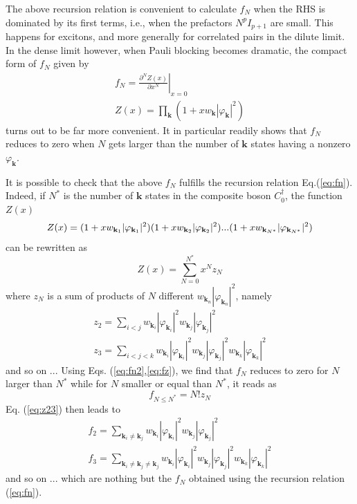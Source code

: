 \documentclass[aps,prb,preprint,groupedaddress,amsmath]{revtex4-1}
\newcommand{\vk}{\ensuremath{\mathbf{k}}}
\newcommand{\dg}{\ensuremath{\dagger}}
\begin{document}
The above recursion relation is convenient to calculate $f_N$ when the RHS is dominated by its first terms, i.e., when the prefactors $N^pI_{p+1}$ are small.  This happens for excitons,  and more generally for correlated pairs in the dilute limit.  In the dense limit however, when Pauli blocking becomes dramatic, the compact form of  $f_N$   given by 
\begin{equation}\label{eq:fn2}
\begin{split}
f_N=\left.\frac{\partial^NZ(x)}{\partial{x^N}}\right|_{x=0}\\
Z(x)=\prod_\vk(1+xw_\vk|\varphi_\vk|^2)
\end{split}
\end{equation}
turns out to be far more convenient. It in particular readily shows that $f_N$ reduces to zero when $N$ gets larger than the number of $\vk$ states having a nonzero $\varphi_\vk$. 

It is possible to check that the above $f_N$ fulfills the recursion relation Eq.(\ref{eq:fn}). Indeed, if $N^*$ is the number of $\vk$ states in the composite boson $C_0^\dg$, the function $Z(x)$
\begin{equation}
Z(x)=(1+xw_{\vk_1}|\varphi_{\vk_1}|^2)(1+xw_{\vk_2}|\varphi_{\vk_2}|^2)...(1+xw_{\vk_{N^*}}|\varphi_{\vk_{N^*}}|^2)\\
\end{equation}
can be rewritten as
\begin{equation}\label{eq:fz}
Z(x)= \sum_{N=0}^{N^*}x^Nz_N
\end{equation}
where $z_N$ is a sum of products of $N$ different $w_{\vk_n}|\varphi_{\vk_n}|^2$, namely
\begin{equation}\label{eq:z23}
\begin{split}
z_2= \sum_{i<j}w_{\vk_i}|\varphi_{\vk_i}|^2w_{\vk_j}|\varphi_{\vk_j}|^2\\
z_3= \sum_{i<j<k}w_{\vk_i}|\varphi_{\vk_i}|^2w_{\vk_j}|\varphi_{\vk_j}|^2w_{\vk_k}|\varphi_{\vk_k}|^2
\end{split}
\end{equation}
and so on ... Using Eqs. (\ref{eq:fn2},\ref{eq:fz}), we find that $f_N$ reduces to zero for $N$ larger than $N^*$ while for $N$ smaller or equal  than  $N^*$, it reads as
\begin{equation}
f_{N\le{}N^*}=N!z_N
\end{equation}
Eq. (\ref{eq:z23}) then leads to
\begin{equation}\label{eq:f23}
\begin{split}
f_2= \sum_{\vk_i\neq\vk_j}w_{\vk_i}|\varphi_{\vk_i}|^2w_{\vk_j}|\varphi_{\vk_j}|^2\\
f_3= \sum_{\vk_i\neq\vk_j\neq\vk_j}w_{\vk_i}|\varphi_{\vk_i}|^2w_{\vk_j}|\varphi_{\vk_j}|^2w_{\vk_k}|\varphi_{\vk_k}|^2
\end{split}
\end{equation}
and so on ... which are nothing but the $f_N$ obtained using the recursion relation (\ref{eq:fn}).
\end{document}
